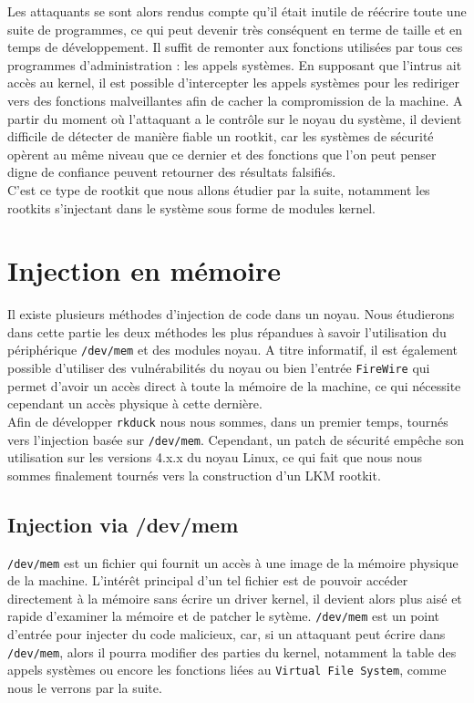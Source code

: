 \documentclass[12pt]{article}
\begin{document}
    Les attaquants se sont alors rendus compte qu'il était inutile de réécrire toute une suite de programmes, ce qui peut devenir très conséquent en terme de taille et en temps de développement. Il suffit de remonter aux fonctions utilisées par tous ces programmes d'administration : les appels systèmes. En supposant que l'intrus ait accès au kernel, il est possible d'intercepter les appels systèmes pour les rediriger vers des fonctions malveillantes afin de cacher la compromission de la machine. A partir du moment où l'attaquant a le contrôle sur le noyau du système, il devient difficile de détecter de manière fiable un rootkit, car les systèmes de sécurité opèrent au même niveau que ce dernier et des fonctions que l'on peut penser digne de confiance peuvent retourner des résultats falsifiés. \\
    C'est ce type de rootkit que nous allons étudier par la suite, notamment les rootkits s'injectant dans le système sous forme de modules kernel\cite{suterusu}.



\section{Injection en mémoire}

    Il existe plusieurs méthodes d'injection de code dans un noyau. Nous étudierons dans cette partie les deux méthodes les plus répandues à savoir l'utilisation du périphérique \texttt{/dev/mem}\cite{devmem} et des modules noyau. A titre informatif, il est également possible d'utiliser des vulnérabilités du noyau ou bien l'entrée \texttt{FireWire} qui permet d'avoir un accès direct à toute la mémoire de la machine, ce qui nécessite cependant un accès physique à cette dernière.\\

    Afin de développer \texttt{rkduck} nous nous sommes, dans un premier temps, tournés vers l'injection basée sur \texttt{/dev/mem}. Cependant, un patch de sécurité empêche son utilisation sur les versions 4.x.x du noyau Linux, ce qui fait que nous nous sommes finalement tournés vers la construction d'un LKM rootkit.

    \subsection{Injection via /dev/mem}
    
        \texttt{/dev/mem} est un fichier qui fournit un accès à une image de la mémoire physique de la machine. L'intérêt principal d'un tel fichier est de pouvoir accéder directement à la mémoire sans écrire un driver kernel, il devient alors plus aisé et rapide d'examiner la mémoire et de patcher le sytème. \texttt{/dev/mem} est un point d'entrée pour injecter du code malicieux\cite{hackin9}\cite{sstic}, car, si un attaquant peut écrire dans \texttt{/dev/mem}, alors il pourra modifier des parties du kernel, notamment la table des appels systèmes ou encore les fonctions liées au \texttt{Virtual File System}, comme nous le verrons par la suite.\\
        
\end{document}
